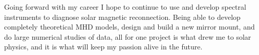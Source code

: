 \documentclass[10pt,letterpaper]{article}
\begin{document}
	Going forward with my career I hope to continue to use and develop spectral instruments to diagnose solar magnetic reconnection.  Being able to develop completely theoretical MHD models, design and build a new mirror mount, and do large numerical studies of data, all for one project is what drew me to solar physics, and it is what will keep my passion alive in the future.
	
	
\end{document}

